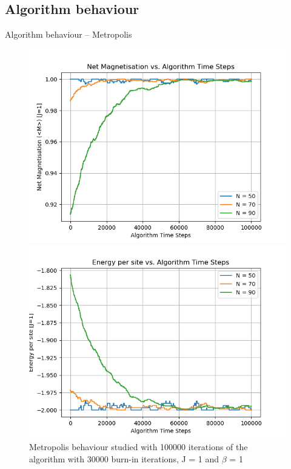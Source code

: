 \documentclass{beamer}
\begin{document}
\subsection{Algorithm behaviour}
\begin{frame}{Algorithm behaviour – Metropolis}
    \begin{figure}[htbp]
	\begin{center}
		\begin{minipage}[t]{0.49\linewidth}
			\centering
			\includegraphics[width=\linewidth]{metro_algobehaviour1.png}
		\end{minipage}
		\begin{minipage}[t]{0.49\linewidth}
			\centering
			\includegraphics[width=\linewidth]{metro_algobehaviour2.png}
		\end{minipage}
        \caption{Metropolis behaviour studied with 100000 iterations of the algorithm with 30000 burn-in iterations, J = 1 and $\beta$ = 1}
	\end{center}
    \end{figure}
\end{frame}
\end{document}
